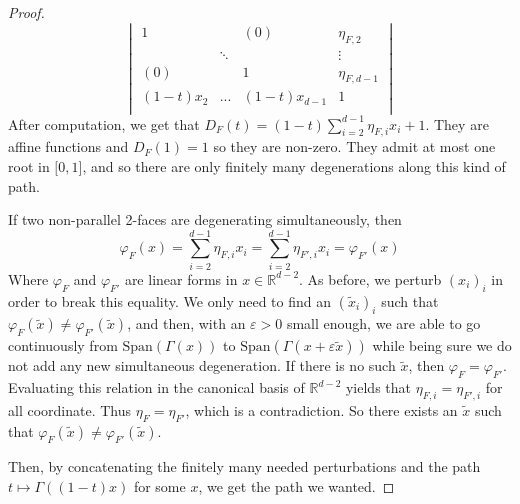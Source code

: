 \documentclass[10pt,a4paper]{amsart}
\newcommand{\R}{\mathbb R}
\newcommand{\vect}{\text{Span}}
\begin{document}
\begin{proof}
\[\begin{vmatrix}
        1& &(0) &\eta_{F,2} \\
         &\ddots& & \vdots \\
        (0)& &1 & \eta_{F,d-1} \\
        (1-t)x_2&...&(1-t)x_{d-1} &1\\
    \end{vmatrix} \] After computation, we get that $\displaystyle D_F(t) = (1-t)\sum_{i=2}^{d-1}\eta_{F,i}x_i +1 $. They are affine functions and $D_F(1) = 1$ so they are non-zero. They admit at most one root in $\mathopen [0,1  \mathclose]$, and so there are only finitely many degenerations along this kind of path.
    
    If two non-parallel 2-faces are degenerating simultaneously, then \[ \varphi_F(x) = \sum_{i=2}^{d-1}\eta_{F,i}x_i = \sum_{i=2}^{d-1}\eta_{F',i}x_i = \varphi_{F'}(x) \] Where $\varphi_F$ and $\varphi_{F'}$ are linear forms in $x\in \R^{d-2}$. As before, we perturb $(x_i)_i$ in order to break this equality. We only need to find an $(\tilde x_i)_i$ such that $\varphi_F(\tilde x) \neq \varphi_{F'} (\tilde x)$, and then, with an $\varepsilon>0$ small enough, we are able to go continuously from $\vect(\Gamma(x))$ to $\vect(\Gamma(x+\varepsilon \tilde x))$ while being sure we do not add any new simultaneous degeneration. If there is no such $\tilde x$, then $\varphi_F = \varphi_{F'}$. Evaluating this relation in the canonical basis of $\R^{d-2}$ yields that $\eta_{F,i} = \eta_{F',i}$ for all coordinate. Thus $\eta_F = \eta_{F'}$, which is a contradiction. So there exists an $\tilde x$ such that $\varphi_F(\tilde x) \neq \varphi_{F'} (\tilde x)$.
    
    Then, by concatenating the finitely many needed perturbations and the path $t\mapsto \Gamma((1-t)x)$ for some $x$, we get the path we wanted.
\end{proof}
\end{document}
